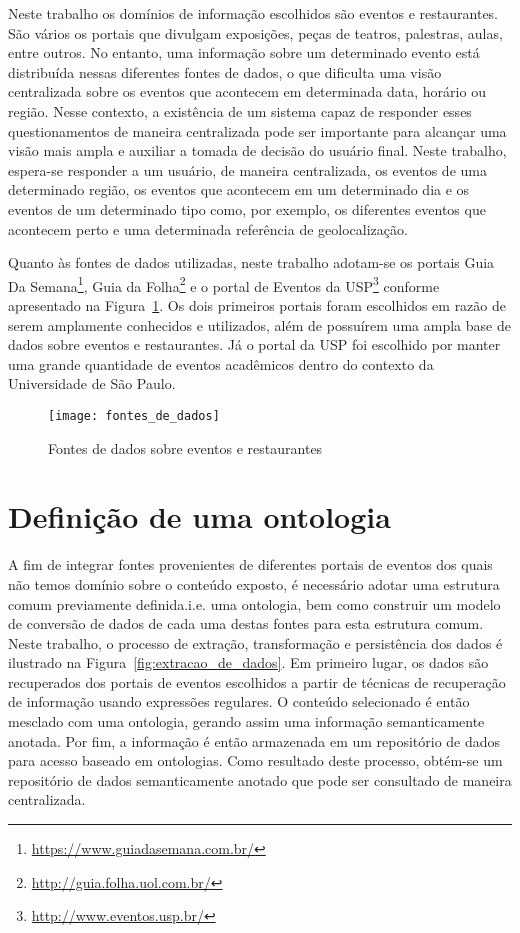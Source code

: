 Neste trabalho os domínios de informação escolhidos são eventos e restaurantes. São vários os portais que divulgam exposições, peças de teatros, palestras, aulas, entre outros. No entanto, uma informação sobre um determinado evento está distribuída nessas diferentes fontes de dados, o que dificulta uma visão centralizada sobre os eventos que acontecem em determinada data, horário ou região. Nesse contexto, a existência de um sistema capaz de responder esses questionamentos de maneira centralizada pode ser importante para alcançar uma visão mais ampla e auxiliar a tomada de decisão do usuário final. Neste trabalho, espera-se responder a um usuário, de maneira centralizada, os eventos de uma determinado região, os eventos que acontecem em um determinado dia e os eventos de um determinado tipo como, por exemplo, os diferentes eventos que acontecem perto e uma determinada referência de geolocalização. 

Quanto às fontes de dados utilizadas, neste trabalho adotam-se  os portais Guia Da Semana\footnote{\url{https://www.guiadasemana.com.br/}}, Guia da Folha\footnote{\url{http://guia.folha.uol.com.br/}} e o portal de Eventos da USP\footnote{\url{http://www.eventos.usp.br/}} conforme apresentado na Figura~\ref{fig:fontes_de_dados}. Os dois primeiros portais foram escolhidos em razão de serem amplamente conhecidos e utilizados, além de possuírem uma ampla base de dados sobre eventos e restaurantes. Já o portal da USP foi escolhido por manter uma grande quantidade de eventos acadêmicos dentro do contexto da Universidade de São Paulo. 

\begin{figure}[!ht]
  \centering
  \texttt{[image: fontes\_de\_dados]} 
  \caption{Fontes de dados sobre eventos e restaurantes}
  \label{fig:fontes_de_dados} 
\end{figure}

\section{Definição de uma ontologia}
\label{sec:ontologia}

A fim de integrar fontes provenientes de diferentes portais de eventos dos quais não temos domínio sobre o conteúdo exposto, é necessário adotar uma estrutura comum previamente definida.i.e. uma ontologia, bem como construir um modelo de conversão de dados de cada uma destas fontes para esta estrutura comum. Neste trabalho, o processo de extração, transformação e persistência dos dados é ilustrado na Figura~\ref{fig:extracao_de_dados}. Em primeiro lugar, os dados são recuperados dos portais de eventos escolhidos a partir de técnicas de recuperação de informação usando expressões regulares. O conteúdo selecionado é então mesclado com uma ontologia, gerando assim uma informação semanticamente anotada. Por fim, a informação é então armazenada em um repositório de dados para acesso baseado em ontologias. Como resultado deste processo, obtém-se um repositório de dados semanticamente anotado que pode ser consultado de maneira centralizada. 

